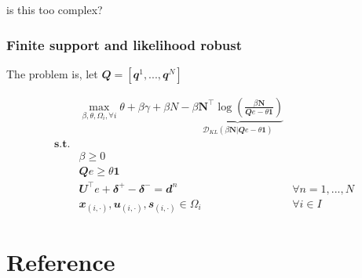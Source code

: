 \documentclass[
  a4paper,
,tablecaptionabove
]{scrartcl}
\numberwithin{equation}{section}
\begin{document}
is this too complex?

\hypertarget{sec:finite-support-and-likelihood-robust}{%
  \subsubsection{Finite support and likelihood
    robust}\label{finite-support-and-likelihood-robust}}

The problem is, let
\(\mathbfit Q = [\mathbfit{q}^1, ..., \mathbfit{q}^N]\)

\[\begin{aligned}
     & \max_{\beta, \theta, \Omega_i, \forall i} \theta + \beta \gamma +  \beta N - \underbrace{\beta \mathbf N^\top \log(\frac{\beta \mathbf N}{\mathbfit{Q} e-\theta \mathbf 1})}_{\mathcal D_{KL}(\beta \mathbf N | \mathbfit{Q} e-\theta \mathbf 1)}                         \\
    \textbf {s.t.}                                                                                                                                                                                                                                                               \\
     & \beta \ge 0                                                                                                                                                                                                                                                               \\
     & \mathbfit{Q} e \ge \theta \mathbf 1                                                                                                                                                                                                                                       \\
     & \mathbfit{U} ^\top e + \mathbfit \delta^+ - \mathbfit \delta^-  = \mathbfit d^n                                                                                                                                                                   & \forall n = 1, ..., N \\
     & \mathbfit x_{(i,\cdot)}, \mathbfit u_{(i,\cdot)}, \mathbfit s_{(i,\cdot)} \in \Omega_i                                                                                                                                                            & \forall i\in I
  \end{aligned}\]

\hypertarget{sec:reference}{%
  \section*{Reference}\label{reference}}
\end{document}
